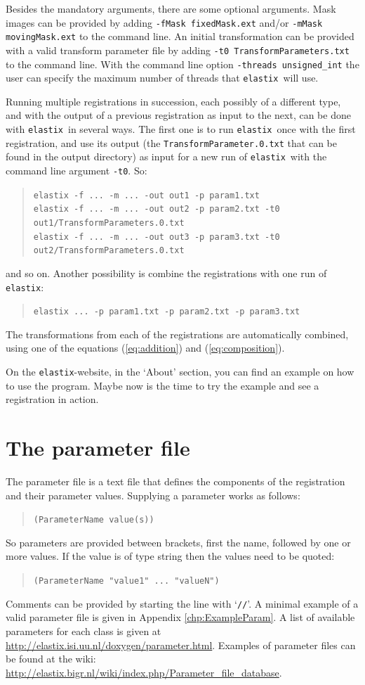 \documentclass[]{report}
\newcommand{\elastix}{\texttt{elastix}}
\begin{document}
Besides the mandatory arguments, there are some optional
arguments. Mask images can be provided by adding \texttt{-fMask
fixedMask.ext} and/or \texttt{-mMask movingMask.ext} to the
command line. An initial transformation can be provided with a
valid transform parameter file by adding \texttt{-t0
TransformParameters.txt} to the command line. With the command
line option \texttt{-threads unsigned\_int} the user can specify
the maximum number of threads that \elastix\ will use.

Running multiple registrations in succession, each possibly of a
different type, and with the output of a previous registration as
input to the next, can be done with \elastix\ in several ways. The
first one is to run \elastix\ once with the first registration, and
use its output (the \texttt{TransformParameter.0.txt} that can be
found in the output directory) as input for a new run of \elastix\
with the command line argument \texttt{-t0}. So:
\begin{quote}
\texttt{elastix -f ... -m ... -out out1 -p param1.txt} \\
\texttt{elastix -f ... -m ... -out out2 -p param2.txt -t0
out1/TransformParameters.0.txt} \\
\texttt{elastix -f ... -m ... -out out3 -p param3.txt -t0
out2/TransformParameters.0.txt}
\end{quote}
and so on. Another possibility is combine the registrations with one
run of \elastix:
\begin{quote}
\texttt{elastix ... -p param1.txt -p param2.txt -p param3.txt}
\end{quote}
The transformations from each of the registrations are automatically
combined, using one of the equations (\ref{eq:addition}) and
(\ref{eq:composition}).

On the \elastix-website, in the `About' section, you can find an
example on how to use the program. Maybe now is the time to try
the example and see a registration in action.


\section{The parameter file}\label{sec:elastix:param}

The parameter file is a text file that defines the components of the
registration and their parameter values. Supplying a parameter works
as follows:
\begin{quote}
\texttt{(ParameterName value(s))}
\end{quote}
So parameters are provided between brackets, first the name,
followed by one or more values. If the value is of type string then
the values need to be quoted:
\begin{quote}
\texttt{(ParameterName "value1" ... "valueN")}
\end{quote}
Comments can be provided by starting the line with `\texttt{//}'. A
minimal example of a valid parameter file is given in Appendix
\ref{chp:ExampleParam}. A list of available parameters for each
class is given at
\url{http://elastix.isi.uu.nl/doxygen/parameter.html}. Examples of
parameter files can be found at the wiki:
\url{http://elastix.bigr.nl/wiki/index.php/Parameter_file_database}.
\end{document}
